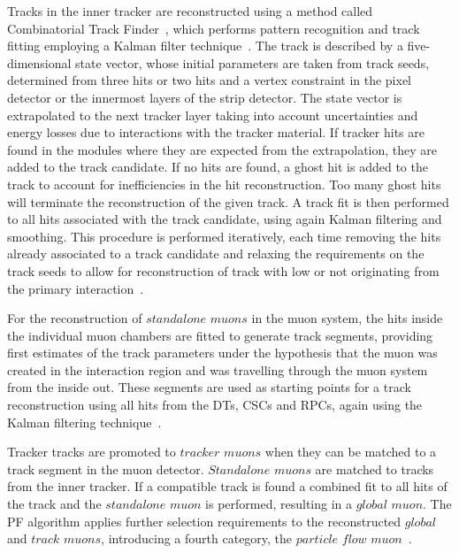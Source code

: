 Tracks in the inner tracker are reconstructed using a method called Combinatorial Track Finder~\cite{Chatrchyan:2014fea}, which performs pattern recognition and track fitting employing a Kalman filter technique~\cite{Fruhwirth1987444}. The track is described by a five-dimensional state vector, whose initial parameters are taken from track seeds, determined from three hits or two hits and a vertex constraint in the pixel detector or the innermost layers of the strip detector. The state vector is extrapolated to the next tracker layer taking into account uncertainties and energy losses due to interactions with the tracker material. If tracker hits are found in the modules where they are expected from the extrapolation, they are added to the track candidate. If no hits are found, a ghost hit is added to the track to account for inefficiencies in the hit reconstruction. Too many ghost hits will terminate the reconstruction of the given track. A track fit is then performed to all hits associated with the track candidate, using again Kalman filtering and smoothing. This procedure is performed iteratively, each time removing the hits already associated to a track candidate and relaxing the requirements on the track seeds to allow for reconstruction of track with low \pt or not originating from the primary interaction~\cite{SWGuideIterativeTracking}. 

For the reconstruction of $\textit{standalone muons}$ in the muon system, the hits inside the individual muon chambers are fitted to generate track segments, providing first estimates of the track parameters under the hypothesis that the muon was created in the interaction region and was travelling through the muon system from the inside out. These segments are used as starting points for a track reconstruction using all hits from the DTs, CSCs and RPCs, again using the Kalman filtering technique~\cite{1748-0221-5-03-T03022}.

Tracker tracks are promoted to $\textit{tracker muons}$ when they can be matched to a track segment in the muon detector. $\textit{Standalone muons}$ are matched to tracks from the inner tracker. If a compatible track is found a combined fit to all hits of the track and the $\textit{standalone muon}$ is performed, resulting in a $\textit{global muon}$. The PF algorithm applies further selection requirements to the reconstructed $\textit{global}$ and $\textit{track muons}$, introducing a fourth category, the $\textit{particle flow muon}$~\cite{CMS-PAS-PFT-10-003}. 

